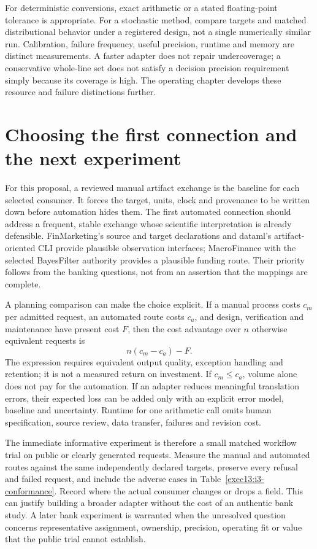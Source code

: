 For deterministic conversions, exact arithmetic or a stated floating-point
tolerance is appropriate. For a stochastic method, compare targets and
matched distributional behavior under a registered design, not a single
numerically similar run. Calibration, failure frequency, useful precision,
runtime and memory are distinct measurements. A faster adapter does not
repair undercoverage; a conservative whole-line set does not satisfy a
decision precision requirement simply because its coverage is high. The
operating chapter develops these resource and failure distinctions further.

\section{Choosing the first connection and the next experiment}

For this proposal, a reviewed manual artifact exchange is the baseline for
each selected consumer. It forces the target, units, clock and provenance to
be written down before automation hides them. The first automated connection
should address a frequent, stable exchange whose scientific interpretation
is already defensible. FinMarketing's source and target declarations and
dataml's artifact-oriented CLI provide plausible observation interfaces;
MacroFinance with the selected BayesFilter authority provides a plausible
funding route. Their priority follows from the banking questions, not from
an assertion that the mappings are complete.

A planning comparison can make the choice explicit. If a manual process
costs $c_m$ per admitted request, an automated route costs $c_a$, and design,
verification and maintenance have present cost $F$, then the cost advantage
over $n$ otherwise equivalent requests is
\[
  n(c_m-c_a)-F.
\]
The expression requires equivalent output quality, exception handling and
retention; it is not a measured return on investment. If $c_m\leq c_a$,
volume alone does not pay for the automation. If an adapter reduces meaningful
translation errors, their expected loss can be added only with an explicit
error model, baseline and uncertainty. Runtime for one arithmetic call omits
human specification, source review, data transfer, failures and revision cost.

The immediate informative experiment is therefore a small matched workflow
trial on public or clearly generated requests. Measure the manual and
automated routes against the same independently declared targets, preserve
every refusal and failed request, and include the adverse cases in
Table~\ref{exec13:i3-conformance}. Record where the actual consumer changes
or drops a field. This can justify building a broader adapter without the
cost of an authentic bank study. A later bank experiment is warranted when
the unresolved question concerns representative assignment, ownership,
precision, operating fit or value that the public trial cannot establish.

